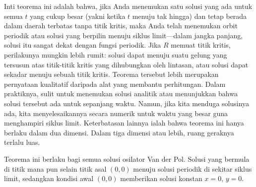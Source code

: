 Inti teorema ini adalah bahwa, jika Anda menemukan satu solusi yang ada untuk
semua $t$ yang cukup besar (yakni ketika $t$ menuju tak hingga) dan tetap
berada dalam daerah terbatas tanpa titik kritis, maka Anda telah menemukan
orbit periodik atau solusi yang berpilin menuju siklus limit---dalam jangka
panjang, solusi itu sangat dekat dengan fungsi periodik.
Jika $R$ memuat titik kritis, perilakunya mungkin lebih rumit: solusi dapat
menuju suatu gelung yang tersusun atas titik-titik kritis yang dihubungkan
oleh lintasan, atau solusi dapat sekadar menuju sebuah titik kritis.
Teorema tersebut lebih merupakan pernyataan kualitatif daripada alat yang
membantu perhitungan. Dalam praktiknya, sulit untuk menemukan solusi analitik
atau menunjukkan bahwa solusi tersebut ada untuk sepanjang waktu.
Namun, jika kita menduga solusinya ada, kita menyelesaikannya secara numerik
untuk waktu yang besar guna menghampiri siklus limit.
Keterbatasan lainnya ialah bahwa teorema ini hanya berlaku dalam dua dimensi.
Dalam tiga dimensi atau lebih, ruang geraknya terlalu luas.

Teorema ini berlaku bagi semua solusi osilator Van der Pol. Solusi yang
bermula di titik mana pun selain titik asal $(0,0)$ menuju solusi periodik
di sekitar siklus limit, sedangkan kondisi awal $(0,0)$ memberikan solusi
konstan $x=0$, $y=0$.

